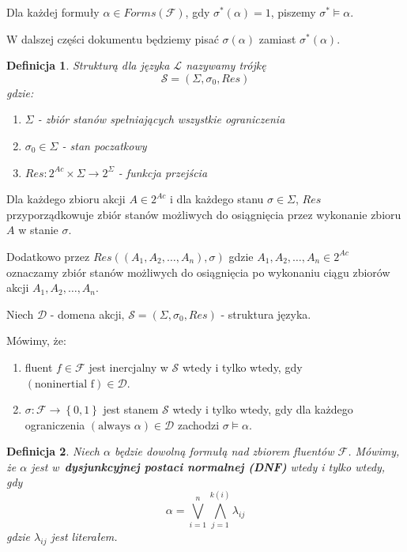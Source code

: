 \documentclass[11pt,a4paper]{article}
\newtheorem{defn}{Definicja}
\begin{document}
Dla każdej formuły $\alpha \in Forms\left(\mathcal{F}\right)$, gdy $\sigma^*\left(\alpha\right) = 1$, piszemy $\sigma^{*} \models \alpha$. 

W dalszej części dokumentu będziemy pisać $\sigma\left(\alpha\right)$ zamiast $\sigma^*\left(\alpha\right)$.

\begin{defn}
Strukturą dla języka $\mathcal{L}$ nazywamy trójkę
$$\mathcal{S} = \left(\Sigma, \sigma_0, Res\right)$$
gdzie:
\begin{enumerate}
    \item $\Sigma$ - zbiór stanów spełniających wszystkie ograniczenia
    \item $\sigma_0 \in \Sigma$ - stan poczatkowy
    \item $Res : 2^{Ac} \times \Sigma \rightarrow 2^\Sigma$ - funkcja przejścia
\end{enumerate}
\end{defn}

Dla każdego zbioru akcji $A \in 2^{Ac}$ i dla każdego stanu $\sigma \in \Sigma$, $Res$ przyporządkowuje zbiór stanów możliwych do osiągnięcia przez wykonanie zbioru $A$ w stanie $\sigma$.

Dodatkowo przez $Res\left(\left(A_1,A_2,\dots,A_n\right),\sigma\right)$ gdzie $A_1,A_2,\dots,A_n \in 2^{Ac}$ oznaczamy zbiór stanów możliwych do osiągnięcia po wykonaniu ciągu zbiorów akcji $A_1,A_2,\dots,A_n$.

Niech $\mathcal{D}$ - domena akcji, $\mathcal{S} = \left(\Sigma, \sigma_0, Res\right)$ - struktura języka.

Mówimy, że:
\begin{enumerate}
    \item fluent $f \in \mathcal{F}$  jest inercjalny w $\mathcal{S}$ wtedy i tylko wtedy, gdy $\left(\text{noninertial f}\right) \in \mathcal{D}$.
    \item $\sigma : \mathcal{F} \rightarrow \left\{0,1\right\}$ jest stanem $\mathcal{S}$ wtedy i tylko wtedy, gdy dla każdego ograniczenia $\left(\text{always } \alpha\right) \in \mathcal{D}$ zachodzi $\sigma \models \alpha$.
\end{enumerate}



\begin{defn}
Niech $\alpha$ będzie dowolną formułą nad zbiorem fluentów $\mathcal{F}$. Mówimy, że $\alpha$ jest w~\textbf{dysjunkcyjnej postaci normalnej (DNF)} wtedy i tylko wtedy, gdy 
$$\alpha = \bigvee_{i=1}^{n} \bigwedge_{j=1}^{k(i)} \lambda_{ij}$$
gdzie $\lambda_{ij}$ jest literałem.
\end{defn}
\end{document}
